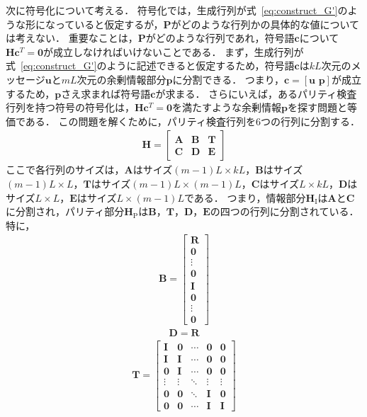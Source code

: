 \documentclass[twocolumn, a4paper]{ieicejsp}
\begin{document}
次に符号化について考える．
符号化では，生成行列が式~\eqref{eq:construct_G'}のような形になっていると仮定するが，$\mathbf{P}$がどのような行列かの具体的な値については考えない．
重要なことは，$\mathbf{P}$がどのような行列であれ，符号語$\mathbf{c}$について$\mathbf{H}\mathbf{c}^{T} = \mathbf{0}$が成立しなければいけないことである．
まず，生成行列が式~\eqref{eq:construct_G'}のように記述できると仮定するため，符号語$\mathbf{c}$は$kL$次元のメッセージ$\mathbf{u}$と$mL$次元の余剰情報部分$\mathbf{p}$に分割できる．
つまり，$\mathbf{c}=[\mathbf{u} \,\, \mathbf{p}]$が成立するため，$\mathbf{p}$さえ求まれば符号語$\mathbf{c}$が求まる．
さらにいえば，あるパリティ検査行列を持つ符号の符号化は，$\mathbf{H}\mathbf{c}^{T} = \mathbf{0}$を満たすような余剰情報$\mathbf{p}$を探す問題と等価である．
この問題を解くために，パリティ検査行列を6つの行列に分割する．
\begin{align}
  \mathbf{H} = \begin{bmatrix}
    \mathbf{A} & \mathbf{B} & \mathbf{T} \\
    \mathbf{C} & \mathbf{D} & \mathbf{E}
  \end{bmatrix}
\end{align}
ここで各行列のサイズは，$\mathbf{A}$はサイズ$(m-1)L \times kL$，$\mathbf{B}$はサイズ$(m-1)L \times L$，$\mathbf{T}$はサイズ$(m-1)L \times (m-1)L$，$\mathbf{C}$はサイズ$L \times kL$，$\mathbf{D}$はサイズ$L \times L$，$\mathbf{E}$はサイズ$L \times (m-1)L$である．
つまり，情報部分$\mathbf{H}_{\mathrm{I}}$は$\mathbf{A}$と$\mathbf{C}$に分割され，パリティ部分$\mathbf{H}_{\mathrm{P}}$は$\mathbf{B}$，$\mathbf{T}$，$\mathbf{D}$，$\mathbf{E}$の四つの行列に分割されている．
特に，
\begin{align}
  \mathbf{B} = \begin{bmatrix}
    \mathbf{R} \\
    \mathbf{0} \\
    \vdots \\
    \mathbf{0}\\
    \mathbf{I} \\
    \mathbf{0} \\
    \vdots \\
    \mathbf{0}
  \end{bmatrix}
\end{align}
\begin{align}
  \mathbf{D} = \mathbf{R}
\end{align}
\begin{align}
  \mathbf{T} = \begin{bmatrix}
    \mathbf{I} & \mathbf{0} & \cdots & \mathbf{0} & \mathbf{0} \\
     \mathbf{I} & \mathbf{I} & \cdots & \mathbf{0} & \mathbf{0} \\
     \mathbf{0} & \mathbf{I} & \cdots & \mathbf{0} & \mathbf{0} \\
     \vdots & \vdots & \ddots & \vdots & \vdots \\
     \mathbf{0} & \mathbf{0} & \ddots & \mathbf{I} & \mathbf{0} \\
     \mathbf{0} & \mathbf{0} & \cdots & \mathbf{I} & \mathbf{I}
  \end{bmatrix}
\end{align}
\end{document}
